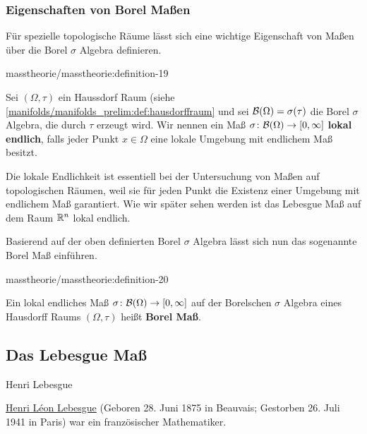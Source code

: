 \subsubsection{Eigenschaften von Borel Maßen}
\label{\detokenize{masstheorie/masstheorie:eigenschaften-von-borel-maszen}}
\par
Für spezielle topologische Räume lässt sich eine wichtige Eigenschaft von Maßen über die Borel \(\sigma\) Algebra definieren.
\begin{definition}{}{masstheorie/masstheorie:definition-19}



\par
Sei \((\Omega, \tau)\) ein Haussdorf Raum (siehe \cref{manifolds/manifolds_prelim:def:hausdorffraum}  und sei \(\mathcal{B}(\Omega) = \sigma(\tau)\) die Borel \(\sigma\) Algebra, die durch \(\tau\) erzeugt wird.
Wir nennen ein Maß \(\sigma \colon \mathcal{B}(\Omega) \rightarrow [0, \infty]\) \textbf{lokal endlich}, falls jeder Punkt \(x \in \Omega\) eine lokale Umgebung mit endlichem Maß besitzt.
\end{definition}

\par
Die lokale Endlichkeit ist essentiell bei der Untersuchung von Maßen auf topologischen Räumen, weil sie für jeden Punkt die Existenz einer Umgebung mit endlichem Maß garantiert.
Wie wir später sehen werden ist das Lebesgue Maß auf dem Raum \(\mathbb{R}^n\) lokal endlich.

\par
Basierend auf der oben definierten Borel \(\sigma\) Algebra lässt sich nun das sogenannte Borel Maß einführen.
\begin{definition}{}{masstheorie/masstheorie:definition-20}



\par
Ein lokal endliches Maß \(\sigma \colon \mathcal{B}(\Omega) \rightarrow [0, \infty]\) auf der Borelschen \(\sigma\) Algebra eines Hausdorff Raums \((\Omega,\tau)\) heißt \textbf{Borel Maß}.
\end{definition}


\subsection{Das Lebesgue Maß}
\label{\detokenize{masstheorie/masstheorie:das-lebesgue-masz}}\label{\detokenize{masstheorie/masstheorie:s-lebesguemeasure}}
\begin{emphBox}{Henri Lebesgue}{}

\par
\href{https://en.wikipedia.org/wiki/Henri\_Lebesgue}{Henri Léon Lebesgue} (Geboren 28. Juni 1875 in Beauvais; Gestorben 26. Juli 1941 in Paris) war ein französischer Mathematiker.
\end{emphBox}

